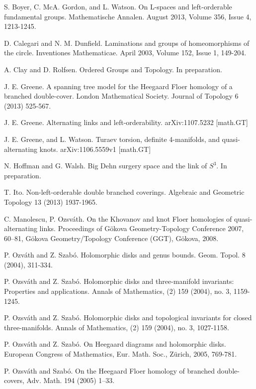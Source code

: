 \begin{thebibliography}{2013}



S. Boyer, C. McA. Gordon, and L. Watson. {On L-spaces and left-orderable fundamental groups}. Mathematische Annalen. August 2013, Volume 356, Issue 4, 1213-1245.

D. Calegari and N. M. Dunfield. {Laminations and groups of homeomorphisms of the circle}. Inventiones Mathematicae. April 2003, Volume 152, Issue 1, 149-204.

A. Clay and D. Rolfsen. {Ordered Groups and Topology}. In preparation.

J. E. Greene. {A spanning tree model for the Heegaard Floer homology of a branched double-cover}. London Mathematical Society. Journal of Topology 6 (2013) 525-567.

J. E. Greene. {Alternating links and left-orderability}. arXiv:1107.5232 [math.GT]

J. E. Greene, and L. Watson. {Turaev torsion, definite 4-manifolds, and quasi-alternating knots}. arXiv:1106.5559v1 [math.GT]

N. Hoffman and G. Walsh. {Big Dehn surgery space and the link of $S^3$}. In preparation.

T. Ito. {Non-left-orderable double branched coverings}. Algebraic and Geometric Topology 13 (2013) 1937-1965.

C. Manolescu, P. Ozsv\'{a}th. {On the Khovanov and knot Floer homologies of quasi-alternating links}. Proceedings of G\"{o}kova Geometry-Topology Conference 2007, 60–81, G\"{o}kova Geometry/Topology Conference (GGT), G\"{o}kova, 2008.

P. Ozv\'{a}th and Z. Szab\'{o}. {Holomorphic disks and genus bounds}. Geom. Topol. 8 (2004), 311-334.

P. Ozsv\'{a}th and Z. Szab\'{o}. {Holomorphic disks and three-manifold
invariants: Properties and applications}. Annals of Mathematics, (2) 159 (2004), no. 3, 1159-1245.

P. Ozsv\'{a}th and Z. Szab\'{o}. {Holomorphic disks and topological invariants for closed three-manifolds.} Annals of Mathematics, (2) 159 (2004), no. 3, 1027-1158.

P. Ozsv\'{a}th and Z. Szab\'{o}. {On Heegaard diagrams and holomorphic disks}. European Congress of Mathematics,
Eur. Math. Soc., Z\"{u}rich, 2005, 769-781.

P. Ozsv\'{a}th and Szab\'{o}. {On the Heegaard Floer homology of branched double-covers}, Adv. Math. 194 (2005) 1–33.

\end{thebibliography}
